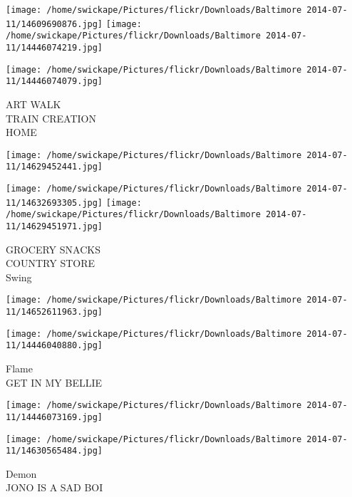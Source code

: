 \documentclass[10pt,letterpaper]{article}
\begin{document}
\texttt{[image: /home/swickape/Pictures/flickr/Downloads/Baltimore 2014-07-11/14609690876.jpg]}
\texttt{[image: /home/swickape/Pictures/flickr/Downloads/Baltimore 2014-07-11/14446074219.jpg]}

\vspace{0.25in}
\texttt{[image: /home/swickape/Pictures/flickr/Downloads/Baltimore 2014-07-11/14446074079.jpg]}

ART WALK\\
TRAIN CREATION\\
HOME
\pagebreak

\texttt{[image: /home/swickape/Pictures/flickr/Downloads/Baltimore 2014-07-11/14629452441.jpg]}

\vspace{0.25in}
\texttt{[image: /home/swickape/Pictures/flickr/Downloads/Baltimore 2014-07-11/14632693305.jpg]}
\texttt{[image: /home/swickape/Pictures/flickr/Downloads/Baltimore 2014-07-11/14629451971.jpg]}

GROCERY SNACKS\\
COUNTRY STORE\\
Swing
\pagebreak

\texttt{[image: /home/swickape/Pictures/flickr/Downloads/Baltimore 2014-07-11/14652611963.jpg]}

\vspace{0.25in}
\texttt{[image: /home/swickape/Pictures/flickr/Downloads/Baltimore 2014-07-11/14446040880.jpg]}

Flame\\
GET IN MY BELLIE
\pagebreak

\texttt{[image: /home/swickape/Pictures/flickr/Downloads/Baltimore 2014-07-11/14446073169.jpg]}

\vspace{0.25in}
\texttt{[image: /home/swickape/Pictures/flickr/Downloads/Baltimore 2014-07-11/14630565484.jpg]}

Demon\\
JONO IS A SAD BOI
\pagebreak
\end{document}
